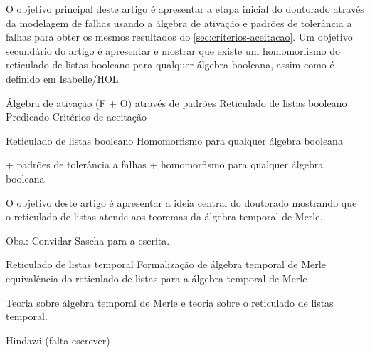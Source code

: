 \documentclass[a5paper,portuges]{article}
\begin{document}
\begin{artigo}
\label{sec:padroes-tolerancia}
\begin{objetivo}
O objetivo principal deste artigo é apresentar a etapa inicial do doutorado através da modelagem de falhas usando a álgebra de ativação e padrões de tolerância a falhas para obter os mesmos resultados do \cref{sec:criterios-aceitacao}. Um objetivo secundário do artigo é apresentar e mostrar que existe um homomorfismo do reticulado de listas booleano para qualquer álgebra booleana, assim como é definido em Isabelle/HOL.
\end{objetivo}
\begin{fluxo}
Álgebra de ativação (F + O) através de padrões \passofluxo Reticulado de listas booleano \passofluxo Predicado \passofluxo Critérios de aceitação

Reticulado de listas booleano \passofluxo Homomorfismo para qualquer álgebra booleana
\end{fluxo}
\begin{paraconseguir}
 + padrões de tolerância a falhas + homomorfismo para qualquer álgebra booleana 
\end{paraconseguir}

\begin{submissao}
  \item 
\end{submissao}
\end{artigo}

\begin{artigo}
\label{sec:algebra-merle}
\begin{objetivo}
O objetivo deste artigo é apresentar a ideia central do doutorado mostrando que o reticulado de listas atende aos teoremas da álgebra temporal de Merle. 

Obs.: Convidar Sascha para a escrita.
\end{objetivo}

\begin{fluxo}
Reticulado de listas temporal \passofluxo Formalização de álgebra temporal de Merle \passofluxo equivalência do reticulado de listas para a álgebra temporal de Merle
\end{fluxo}

\begin{paraconseguir}
Teoria sobre álgebra temporal de Merle e teoria sobre o reticulado de listas temporal. 
\end{paraconseguir}
\begin{submissao}
  \item Hindawi (falta escrever)
\end{submissao}
\end{artigo}
\end{document}
